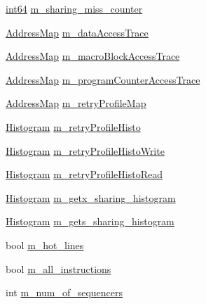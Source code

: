 \begin{DoxyCompactItemize}
\item 
\hyperlink{TypeDefines_8hh_aecfc3c54bd29ad5964e1c1c3ccbf89df}{int64} \hyperlink{classAddressProfiler_a20e874443e8d69362f989878d804fde9}{m\_\-sharing\_\-miss\_\-counter}
\item 
\hyperlink{classAddressProfiler_a8a9f1225b5c1cb2d26e7cea035910b56}{AddressMap} \hyperlink{classAddressProfiler_a524d8a56b5050e28af4fa074b77ad38d}{m\_\-dataAccessTrace}
\item 
\hyperlink{classAddressProfiler_a8a9f1225b5c1cb2d26e7cea035910b56}{AddressMap} \hyperlink{classAddressProfiler_ad55da4039a01bb4b94ba1cf7423d2b0b}{m\_\-macroBlockAccessTrace}
\item 
\hyperlink{classAddressProfiler_a8a9f1225b5c1cb2d26e7cea035910b56}{AddressMap} \hyperlink{classAddressProfiler_add87ed2083e606197b3a461e240265fe}{m\_\-programCounterAccessTrace}
\item 
\hyperlink{classAddressProfiler_a8a9f1225b5c1cb2d26e7cea035910b56}{AddressMap} \hyperlink{classAddressProfiler_a5955c6c282623622af31f869827f70eb}{m\_\-retryProfileMap}
\item 
\hyperlink{classHistogram}{Histogram} \hyperlink{classAddressProfiler_ad4161c63b4a05631ec9e072cb6155c14}{m\_\-retryProfileHisto}
\item 
\hyperlink{classHistogram}{Histogram} \hyperlink{classAddressProfiler_a4d31cdef4eb6fd3bf397cfa76522688f}{m\_\-retryProfileHistoWrite}
\item 
\hyperlink{classHistogram}{Histogram} \hyperlink{classAddressProfiler_ad7a5f305526e5d643476bd8a77b31e63}{m\_\-retryProfileHistoRead}
\item 
\hyperlink{classHistogram}{Histogram} \hyperlink{classAddressProfiler_a50c23c3bc724b0e58e2702923fbd729c}{m\_\-getx\_\-sharing\_\-histogram}
\item 
\hyperlink{classHistogram}{Histogram} \hyperlink{classAddressProfiler_abad849fa15b8dabdb10a90d412691484}{m\_\-gets\_\-sharing\_\-histogram}
\item 
bool \hyperlink{classAddressProfiler_a3b63dfc643f2cf98e6d5deff9fce467e}{m\_\-hot\_\-lines}
\item 
bool \hyperlink{classAddressProfiler_a32e2ae13dc24a9bd92b83fa9e02477ff}{m\_\-all\_\-instructions}
\item 
int \hyperlink{classAddressProfiler_a7ba3ff540bbbb92208f2957cfcd9709f}{m\_\-num\_\-of\_\-sequencers}
\end{DoxyCompactItemize}


